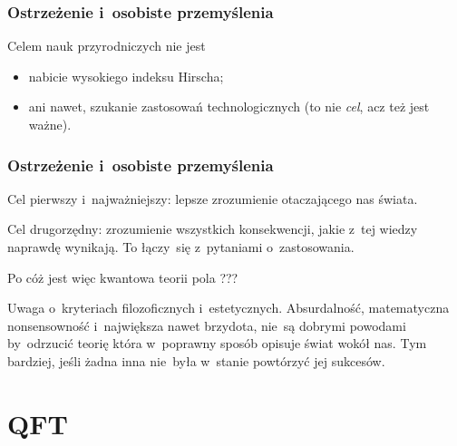 \documentclass[10pt,t]{beamer}
\begin{document}
\begin{frame}
  \frametitle{Ostrzeżenie i~osobiste przemyślenia}


  Celem nauk przyrodniczych nie jest
  \begin{itemize}

  \item nabicie wysokiego indeksu Hirscha;

  \item ani nawet, szukanie zastosowań technologicznych (to nie
    {\color{red} \textit{cel}}, acz też jest ważne).

  \end{itemize}

\end{frame}





\begin{frame}
  \frametitle{Ostrzeżenie i~osobiste przemyślenia}


  Cel pierwszy i~najważniejszy: lepsze zrozumienie otaczającego nas świata.

  Cel drugorzędny: zrozumienie wszystkich konsekwencji, jakie z~tej wiedzy
  naprawdę wynikają. To łączy~się z~pytaniami o~zastosowania.

  Po cóż jest więc kwantowa teorii pola{\LARGE \color{red} ???}

  Uwaga o~kryteriach filozoficznych i~estetycznych.
  Absurdalność, matematyczna nonsensowność i~największa nawet
  brzydota, nie~są dobrymi powodami by~odrzucić teorię która
  w~poprawny sposób opisuje świat wokół nas. Tym bardziej, jeśli żadna
  inna nie~była w~stanie powtórzyć jej sukcesów.

\end{frame}










\section{QFT}
\end{document}
